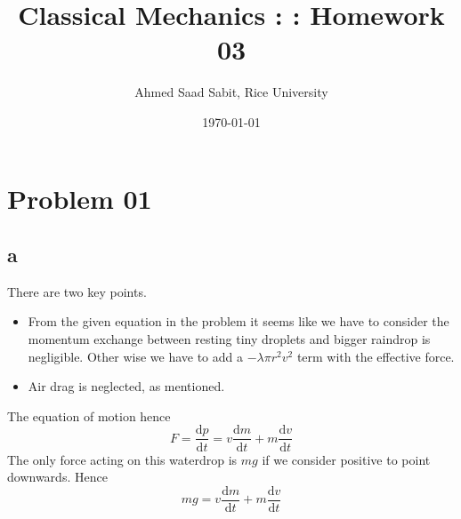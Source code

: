 \documentclass[letter]{article}
\title{Classical Mechanics : : Homework 03}
\author{Ahmed Saad Sabit, Rice University}
\date{\today}
\begin{document}
\maketitle
\tableofcontents 
\newpage 
\section{Problem 01} 
\subsection{a}
There are two key points. 
\begin{itemize}
	\item From the given equation in the problem it seems like we have to consider the momentum exchange between resting tiny droplets and bigger raindrop is negligible. Other wise we have to add a $- \lambda \pi r^2 v^2$ term with the effective force. 
	\item Air drag is neglected, as mentioned.
\end{itemize}
The equation of motion hence
\[
F = \frac{\mathrm{d} p}{\mathrm{d} t} = v \frac{\mathrm{d} m}{\mathrm{d} t} + m \frac{\mathrm{d} v}{\mathrm{d} t}
\] 
The only force acting on this waterdrop is $mg$ if we consider positive to point downwards. Hence
\[
\boxed{
mg = v \frac{\mathrm{d} m}{\mathrm{d} t} + m \frac{\mathrm{d} v}{\mathrm{d} t}
}
\]

\newpage 
\end{document}
